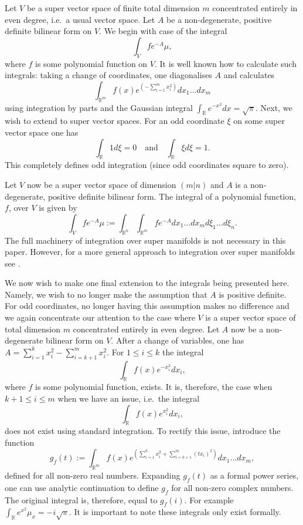 \documentclass[]{amsart}
\theoremstyle{definition}
\begin{document}
Let $V$ be a super vector space of finite total dimension $m$ concentrated entirely in even degree, i.e.~a usual vector space. Let $A$ be a non-degenerate, positive definite bilinear form on $V$. We begin with case of the integral
\[
\int_V f e^{-A} \mu,
\]
where $f$ is some polynomial function on $V$. It is well known how to calculate such integrals: taking a change of coordinates, one diagonalises $A$ and calculates
\[
\int_{\mathbb{R}^m} f(x) e^{(-\sum_{i=1}^m x_i^2)} dx_1\dots dx_m
\]
using integration by parts and the Gaussian integral $\int_{\mathbb{R}} e^{-x^2} dx=\sqrt{\pi}$. Next, we wish to extend to super vector spaces. For an odd coordinate $\xi$ on some super vector space one has
\[
\int_\mathbb{R}1 d\xi=0 {\quad\mathrm{and}\quad} \int_\mathbb{R}\xi d\xi =1.
\]
This completely defines odd integration (since odd coordinates square to zero).

Let $V$ now be a super vector space of dimension $(m|n)$ and $A$ is a non-degenerate, positive definite bilinear form. The integral of a polynomial function, $f$, over $V$ is given by
\[
\int_V f e^{-A} \mu:=\int_{\mathbb{R}^n}\int_{\mathbb{R}^m} f e^{-A} dx_1\dots dx_m d\xi_1\dots d\xi_n.
\]
The full machinery of integration over super manifolds is not necessary in this paper. However, for a more general approach to integration over super manifolds see \cite{khudaverdian_nersessian}.

We now wish to make one final extension to the integrals being presented here. Namely, we wish to no longer make the assumption that $A$ is positive definite. For odd coordinates, no longer having this assumption makes no difference and we again concentrate our attention to the case where $V$ is a super vector space of total dimension $m$ concentrated entirely in even degree. Let $A$ now be a non-degenerate bilinear form on $V$. After a change of variables, one has $A= \sum_{i=1}^{k} x_i^2 - \sum_{i=k+1}^m x_i^2$. For $1\leq i \leq k$ the integral
\[
\int_\mathbb{R} f(x)e^{-x_i^2} dx_i,
\]
where $f$ is some polynomial function, exists. It is, therefore, the case when $k+1\leq i \leq m$ when we have an issue, i.e.~the integral
\[
\int_\mathbb{R} f(x)e^{x_i^2} dx_i,
\]
does not exist using standard integration. To rectify this issue, introduce the function
\[
g_f (t) := \int_{\mathbb{R}^m} f(x) e^{(\sum_{i=1}^{k} x_i^2 
+ \sum_{i=k+1}^m (tx_i)^2)} dx_1\dots dx_m,
\]
defined for all non-zero real numbers. Expanding $g_f (t)$ as a formal power series, one can use analytic continuation to define $g_f$ for all non-zero complex numbers. The original integral is, therefore, equal to $g_f (i)$. For example $\int_{\mathbb{R}} e^{x^2} \mu_x=-i\sqrt{\pi}$. It is important to note these integrals only exist formally.
\end{document}
